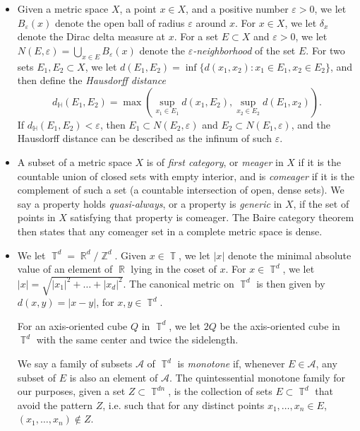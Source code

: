 \documentclass[dvipsnames,letterpaper,12pt]{article}
\numberwithin{equation}{section}
\DeclareMathOperator{\RR}{\mathbb{R}}
\DeclareMathOperator{\ZZ}{\mathbb{Z}}
\DeclareMathOperator{\TT}{\mathbb{T}}
\numberwithin{theorem}{section}
\begin{document}
\begin{itemize}

    \item Given a metric space $X$, a point $x \in X$, and a positive number $\varepsilon > 0$, we let $B_\varepsilon(x)$ denote the open ball of radius $\varepsilon$ around $x$. For $x \in X$, we let $\delta_x$ denote the Dirac delta measure at $x$. For a set $E \subset X$ and $\varepsilon > 0$, we let $N(E,\varepsilon) = \bigcup_{x \in E} B_\varepsilon(x)$ denote the \emph{$\varepsilon$-neighborhood} of the set $E$. For two sets $E_1,E_2 \subset X$, we let $d(E_1,E_2) = \inf \{ d(x_1,x_2) : x_1 \in E_1, x_2 \in E_2 \}$, and then define the \emph{Hausdorff distance}
    \[ d_{\mathbb{H}}(E_1,E_2) = \max \left( \sup_{x_1 \in E_1} d(x_1,E_2), \sup_{x_2 \in E_2} d(E_1,x_2) \right). \]
    If $d_{\mathbb{H}}(E_1,E_2) < \varepsilon$, then $E_1 \subset N(E_2,\varepsilon)$ and $E_2 \subset N(E_1,\varepsilon)$, and the Hausdorff distance can be described as the infinum of such $\varepsilon$.

    \item A subset of a metric space $X$ is of \emph{first category}, or \emph{meager} in $X$ if it is the countable union of closed sets with empty interior, and is \emph{comeager} if it is the complement of such a set (a countable intersection of open, dense sets). We say a property holds \emph{quasi-always}, or a property is \emph{generic} in $X$, if the set of points in $X$ satisfying that property is comeager. The Baire category theorem then states that any comeager set in a complete metric space is dense.

    \item We let $\TT^d = \RR^d/\ZZ^d$. Given $x \in \TT$, we let $|x|$ denote the minimal absolute value of an element of $\RR$ lying in the coset of $x$. For $x \in \TT^d$, we let $|x| = \sqrt{|x_1|^2 + \dots + |x_d|^2}$. The canonical metric on $\TT^d$ is then given by $d(x,y) = |x - y|$, for $x,y \in \TT^d$.

    For an axis-oriented cube $Q$ in $\TT^d$, we let $2Q$ be the axis-oriented cube in $\TT^d$ with the same center and twice the sidelength.

    We say a family of subsets $\mathcal{A}$ of $\TT^d$ is \emph{monotone} if, whenever $E \in \mathcal{A}$, any subset of $E$ is also an element of $\mathcal{A}$. The quintessential monotone family for our purposes, given a set $Z \subset \TT^{dn}$, is the collection of sets $E \subset \TT^d$ that avoid the pattern $Z$, i.e. such that for any distinct points $x_1,\dots,x_n \in E$, $(x_1,\dots,x_n) \not \in Z$.


\end{itemize}
\end{document}
